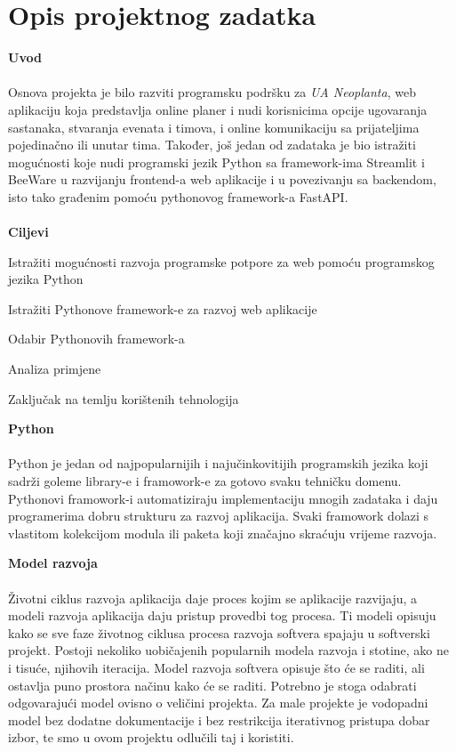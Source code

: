 \chapter{Opis projektnog zadatka}

		\noindent\textbf{Uvod}\\
		\\
		Osnova projekta je bilo razviti programsku podršku za \textit{UA Neoplanta}, web aplikaciju koja predstavlja online planer i nudi korisnicima opcije ugovaranja sastanaka, stvaranja evenata i timova, i online komunikaciju sa prijateljima pojedinačno ili unutar tima. Također, još jedan od zadataka je bio istražiti mogućnosti koje nudi programski jezik Python sa framework-ima Streamlit i BeeWare u razvijanju frontend-a web aplikacije i u povezivanju sa backendom, isto tako građenim pomoću pythonovog framework-a FastAPI.\\
		\\


		\noindent \textbf{Ciljevi}
		\begin{packed_item}

			\item Istražiti mogućnosti razvoja programske potpore za web pomoću programskog jezika Python
			\item Istražiti Pythonove framework-e za razvoj web aplikacije
			\item Odabir Pythonovih framework-a
			\item Analiza primjene
			\item Zaključak na temlju korištenih tehnologija
		\end{packed_item}
		\bigskip

		\noindent\textbf{Python}\\
		\\
		Python je jedan od najpopularnijih i najučinkovitijih programskih jezika koji sadrži goleme library-e i framowork-e za gotovo svaku tehničku domenu. Pythonovi framowork-i automatiziraju implementaciju mnogih zadataka i daju programerima dobru strukturu za razvoj aplikacija. Svaki framowork dolazi s vlastitom kolekcijom modula ili paketa koji značajno skraćuju vrijeme razvoja.\\
		\pagebreak

		\noindent\textbf{Model razvoja}\\
		\\
		Životni ciklus razvoja aplikacija daje proces kojim se aplikacije razvijaju, a modeli
		razvoja aplikacija daju pristup provedbi tog procesa. Ti modeli opisuju kako se sve faze
		životnog ciklusa procesa razvoja softvera spajaju u softverski projekt. Postoji nekoliko
		uobičajenih popularnih modela razvoja i stotine, ako ne i tisuće, njihovih iteracija. Model razvoja softvera opisuje što će se raditi, ali ostavlja puno prostora načinu kako će se raditi. Potrebno je stoga odabrati odgovarajući model ovisno o veličini projekta. Za male projekte je vodopadni model bez dodatne dokumentacije i bez restrikcija iterativnog pristupa dobar izbor, te smo u ovom projektu odlučili taj i koristiti.
		\pagebreak

